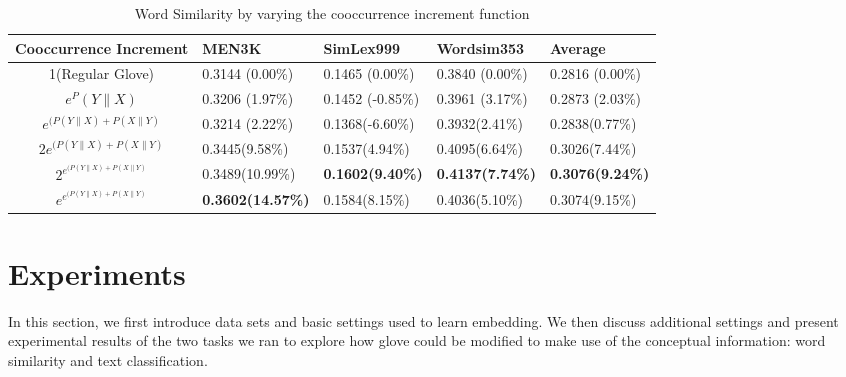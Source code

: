 \documentclass[11pt]{article}
\begin{document}
\begin{table*}[ht]
\centering
\caption{Word Similarity by varying the cooccurrence increment function}
\label{table1}
\begin{tabular}{|c|l|l|l|l|} \hline
Cooccurrence Increment & MEN3K & SimLex999 & Wordsim353 & Average\\ \hline
1(Regular Glove)  & 0.3144 (0.00\%) & 0.1465 (0.00\%) & 0.3840 (0.00\%) & 0.2816  (0.00\%)\\ \hline
$e^P(Y\|X) $ & 0.3206 (1.97\%) & 0.1452 (-0.85\%) & 0.3961 (3.17\%) & 0.2873 (2.03\%)\\ \hline
$e^{(P(Y\|X)+P(X\|Y)}$  & 0.3214 (2.22\%) & 0.1368(-6.60\%) &0.3932(2.41\%) &0.2838(0.77\%) \\ \hline
$2e^{(P(Y\|X)+P(X\|Y)}$  & 0.3445(9.58\%) & 0.1537(4.94\%)   & 0.4095(6.64\%) & 0.3026(7.44\%)  \\ \hline
$2^{e^{(P(Y\|X)+P(X\|Y)}}$ & 0.3489(10.99\%) & \textbf{0.1602(9.40\%)}  & \textbf{0.4137(7.74\%)} & \textbf{0.3076(9.24\%)} \\ \hline
$e^{e^{(P(Y\|X)+P(X\|Y)}}$ &\textbf{0.3602(14.57\%)} & 0.1584(8.15\%) & 0.4036(5.10\%) & 0.3074(9.15\%) \\ \hline
\end{tabular}
\end{table*}  
\section{Experiments}
In this section, we first introduce data sets and basic settings used to learn embedding. We then discuss additional settings and present experimental results of the two tasks we ran to explore how glove could be modified to make use of the conceptual information: word similarity and text classification.
\end{document}

